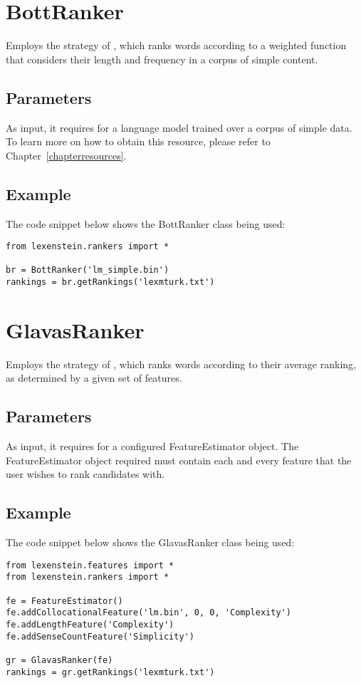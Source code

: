 \section{BottRanker}

Employs the strategy of \cite{Bott2012}, which ranks words according to a weighted function that considers their length and frequency in a corpus of simple content.

\subsection{Parameters}

As input, it requires for a language model trained over a corpus of simple data. To learn more on how to obtain this resource, please refer to Chapter~\ref{chapterresources}.

\subsection{Example}

The code snippet below shows the BottRanker class being used:

\begin{lstlisting}
from lexenstein.rankers import *

br = BottRanker('lm_simple.bin')
rankings = br.getRankings('lexmturk.txt')
\end{lstlisting}











\section{GlavasRanker}

Employs the strategy of \cite{glavas2015}, which ranks words according to their average ranking, as determined by a given set of features.

\subsection{Parameters}

As input, it requires for a configured FeatureEstimator object. The FeatureEstimator object required must contain each and every feature that the user wishes to rank candidates with.

\subsection{Example}

The code snippet below shows the GlavasRanker class being used:

\begin{lstlisting}
from lexenstein.features import *
from lexenstein.rankers import *

fe = FeatureEstimator()
fe.addCollocationalFeature('lm.bin', 0, 0, 'Complexity')
fe.addLengthFeature('Complexity')
fe.addSenseCountFeature('Simplicity')

gr = GlavasRanker(fe)
rankings = gr.getRankings('lexmturk.txt')
\end{lstlisting}